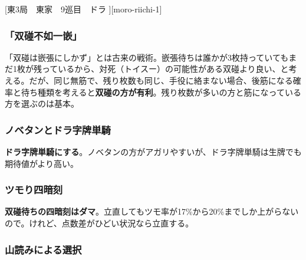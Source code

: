 \documentclass[../nankiru_main.tex]{subfiles}
\begin{document}
[東3局　東家　9巡目　ドラ ][moro-riichi-1]


\subsubsection*{「双碰不如一嵌」} 

「双碰は嵌張にしかず」とは古来の戦術。嵌張待ちは誰かが3枚持っていてもまだ1枚が残っているから、対死（トイスー）の可能性がある双碰より良い、と考える。だが、同じ無筋で、残り枚数も同じ、手役に絡まない場合、後筋になる確率と待ち種類を考えると\textbf{双碰の方が有利}\citep{tsukemai}。残り枚数が多いの方と筋になっている方を選ぶのは基本。


\subsubsection*{ノベタンとドラ字牌単騎} 

\textbf{ドラ字牌単騎にする}\citep[][pp.~75--76]{miinin-choice}。ノベタンの方がアガリやすいが、ドラ字牌単騎は生牌でも期待値がより高い。


\subsubsection*{ツモり四暗刻}

\textbf{双碰待ちの四暗刻はダマ}\citep[][pp.~179--180]{miinin-choice}。立直してもツモ率が17\%から20\%までしか上がらないので。けれど、点数差がひどい状況なら立直する。


\subsubsection*{山読みによる選択}

\begin{rittai}[h]
  \centering
  
  
  \caption{Mリーグ2020 1/2 第2回戦 南2局 0本場（ツモ切り暗転なし）\citep[][p.~57]{muhai}}
  \label{rittai:20200102}
\end{rittai}
\end{document}
